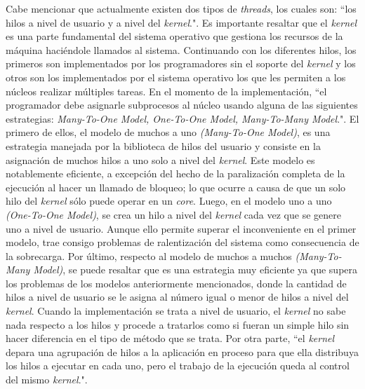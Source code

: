 \documentclass[12pt,letterpaper]{article}
\begin{document}
\newline
\newline
Cabe mencionar que actualmente existen dos tipos de \textit{threads}, los cuales son: ``los hilos a nivel de usuario y a nivel del \textit{kernel}."\cite{c10}. Es importante resaltar que el \textit{kernel} es una parte fundamental del sistema operativo que gestiona los recursos de la máquina haciéndole llamados al sistema. Continuando con los diferentes hilos, los primeros son implementados por los programadores sin el soporte del \textit{kernel} y los otros son los implementados por el sistema operativo los que les permiten a los núcleos realizar múltiples tareas.
\newline
\newline
En el momento de la implementación, ``el programador debe asignarle subprocesos al núcleo usando alguna de las siguientes estrategias: \textit{Many-To-One Model, One-To-One Model, Many-To-Many Model}."\cite{c4}. El primero de ellos, el modelo de muchos a uno \textit{(Many-To-One Model)}, es una estrategia manejada por la biblioteca de hilos del usuario y consiste en la asignación de muchos hilos a uno solo a nivel del \textit{kernel}. Este modelo es notablemente eficiente, a excepción del hecho de la paralización completa de la ejecución al hacer un llamado de bloqueo; lo que ocurre a causa de que un solo hilo del \textit{kernel} sólo puede operar en un \textit{core}. Luego, en el modelo uno a uno \textit{(One-To-One Model)}, se crea un hilo a nivel del \textit{kernel} cada vez que se genere uno a nivel de usuario. Aunque ello permite superar el inconveniente en el primer modelo, trae consigo problemas de ralentización del sistema como consecuencia de la sobrecarga. Por último, respecto al modelo de muchos a muchos \textit{(Many-To-Many Model)}, se puede resaltar que es una estrategia muy eficiente ya que supera los problemas de los modelos anteriormente mencionados, donde la cantidad de hilos a nivel de usuario se le asigna al número igual o menor de hilos a nivel del \textit{kernel}.
\newline
\newline
Cuando la implementación se trata a nivel de usuario, el \textit{kernel} no sabe nada respecto a los hilos y procede a tratarlos como si fueran un simple hilo sin hacer diferencia en el tipo de método que se trata. Por otra parte, ``el \textit{kernel} depara una agrupación de hilos a la aplicación en proceso para que ella distribuya los hilos a ejecutar en cada uno, pero el trabajo de la ejecución queda al control del mismo \textit{kernel}."\cite{c13}. 
\end{document}
